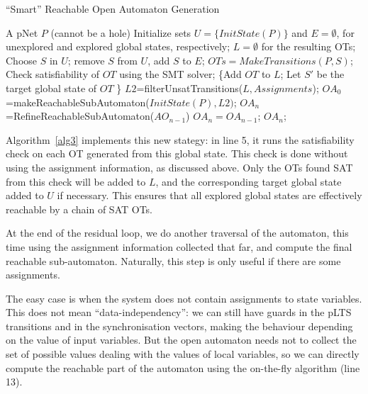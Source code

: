 \documentclass[smallcondensed]{svjour3}
\begin{document}
\begin{algorithm}[h]
  \caption{``Smart'' Reachable Open Automaton Generation}
  \label{alg3}
\begin{algorithmic}[1]
\Require A pNet $P$ (cannot be a hole)
\State Initialize sets $U=\{\mathit{InitState}(P)\}$ and $E=\emptyset$,
for unexplored and explored global states, respectively; $L=\emptyset$ for the resulting OTs;
	\State Choose $S$ in $U$; remove $S$ from $U$, add $S$ to $E$;
	\State $\mathit{OTs} = \mathit{MakeTransitions}(P, S)$;
        Check satisfiability of $\mathit{OT}$ using the SMT solver;
                {\State \{Add $\mathit{OT}$ to $L$;
                  \State Let $S'$ be the target global state of $\mathit{OT}$
                  \}}
	\EndFor
\EndWhile
\State $\mathit{L2}$=filterUnsatTransitions($\mathit{L,Assignments}$);
\State $\mathit{OA_0}$=makeReachableSubAutomaton($\mathit{InitState}(P),L2)$;
\Repeat $\mathit{OA_n}$=RefineReachableSubAutomaton($\mathit{AO_{n-1}}$)
\Until  $\mathit{OA_n}=\mathit{OA_{n-1}}$;
\State \Return $\mathit{OA_n}$;
\end{algorithmic}  
\end{algorithm}

Algorithm~\ref{alg3} implements this new stategy: in line 5, it runs
the satisfiability check on each OT generated from this global
state. This check is done without using the assignment information, as
discussed above. Only the OTs found SAT from this check will be added
to $L$, and the corresponding target global state added to $U$ if
necessary. This ensures that all explored global states are
effectively reachable by a chain of SAT OTs.

At the end of the residual loop, we do another traversal of the
automaton, this time using the assignment information collected that
far, and compute the final reachable sub-automaton. 
Naturally, this step is only useful if there are some assignments.


The easy case is when the system does not contain assignments to state
variables. This does not mean ``data-independency'': we can still have
guards in the pLTS transitions and in the synchronisation vectors,
making the behaviour depending on the value of input variables. But
the open automaton needs not to collect the set of possible values dealing
with the values of local variables, so we can directly compute the
reachable part of the automaton using the on-the-fly algorithm (line 13).
\end{document}
